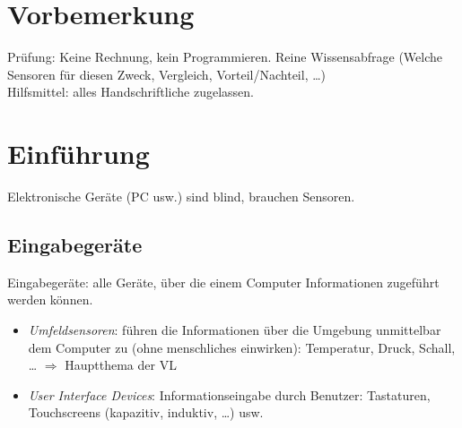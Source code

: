\newcommand{\customDir}{../}





%



\maketitle
\newpage
\tableofcontents
\newpage

\chapter*{Vorbemerkung}
Prüfung: Keine Rechnung, kein Programmieren. Reine Wissensabfrage (Welche Sensoren für diesen Zweck, Vergleich, Vorteil/Nachteil, …)\\
Hilfsmittel: alles Handschriftliche zugelassen.

\setcounter{chapter}{-1}
\chapter{Einführung}

Elektronische Geräte (PC usw.) sind blind, brauchen Sensoren.

\section{Eingabegeräte}
Eingabegeräte: alle Geräte, über die einem Computer Informationen zugeführt werden können.
\begin{itemize}
\item \emph{Umfeldsensoren}: führen die Informationen über die Umgebung unmittelbar dem Computer zu (ohne menschliches einwirken): Temperatur, Druck, Schall, … $\Rightarrow$ Hauptthema der VL
\item \emph{User Interface Devices}: Informationseingabe durch Benutzer: Tastaturen, Touchscreens (kapazitiv, induktiv, …) usw.
\end{itemize}

